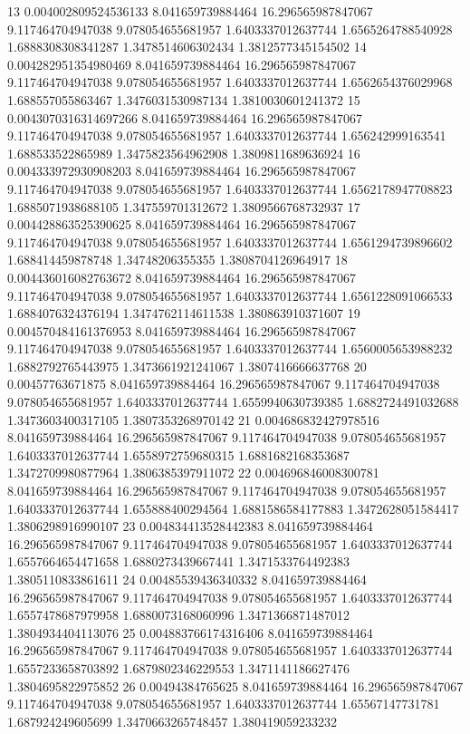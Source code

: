 {13 0.004002809524536133 8.041659739884464 16.296565987847067 9.117464704947038 9.078054655681957 1.6403337012637744 1.6565264788540928 1.6888308308341287 1.3478514606302434 1.3812577345154502
14 0.004282951354980469 8.041659739884464 16.296565987847067 9.117464704947038 9.078054655681957 1.6403337012637744 1.6562654376029968 1.688557055863467 1.3476031530987134 1.3810030601241372
15 0.0043070316314697266 8.041659739884464 16.296565987847067 9.117464704947038 9.078054655681957 1.6403337012637744 1.656242999163541 1.688533522865989 1.3475823564962908 1.3809811689636924
16 0.004333972930908203 8.041659739884464 16.296565987847067 9.117464704947038 9.078054655681957 1.6403337012637744 1.6562178947708823 1.6885071938688105 1.347559701312672 1.3809566768732937
17 0.004428863525390625 8.041659739884464 16.296565987847067 9.117464704947038 9.078054655681957 1.6403337012637744 1.6561294739896602 1.688414459878748 1.34748206355355 1.3808704126964917
18 0.004436016082763672 8.041659739884464 16.296565987847067 9.117464704947038 9.078054655681957 1.6403337012637744 1.6561228091066533 1.6884076324376194 1.3474762114611538 1.380863910371607
19 0.004570484161376953 8.041659739884464 16.296565987847067 9.117464704947038 9.078054655681957 1.6403337012637744 1.6560005653988232 1.6882792765443975 1.3473661921241067 1.3807416666637768
20 0.00457763671875 8.041659739884464 16.296565987847067 9.117464704947038 9.078054655681957 1.6403337012637744 1.6559940630739385 1.6882724491032688 1.3473603400317105 1.3807353268970142
21 0.004686832427978516 8.041659739884464 16.296565987847067 9.117464704947038 9.078054655681957 1.6403337012637744 1.6558972759680315 1.6881682168353687 1.3472709980877964 1.3806385397911072
22 0.004696846008300781 8.041659739884464 16.296565987847067 9.117464704947038 9.078054655681957 1.6403337012637744 1.655888400294564 1.6881586584177883 1.3472628051584417 1.3806298916990107
23 0.004834413528442383 8.041659739884464 16.296565987847067 9.117464704947038 9.078054655681957 1.6403337012637744 1.6557664654471658 1.6880273439667441 1.3471533764492383 1.3805110833861611
24 0.00485539436340332 8.041659739884464 16.296565987847067 9.117464704947038 9.078054655681957 1.6403337012637744 1.6557478687979958 1.6880073168060996 1.3471366871487012 1.3804934404113076
25 0.004883766174316406 8.041659739884464 16.296565987847067 9.117464704947038 9.078054655681957 1.6403337012637744 1.6557233658703892 1.6879802346229553 1.3471141186627476 1.3804695822975852
26 0.00494384765625 8.041659739884464 16.296565987847067 9.117464704947038 9.078054655681957 1.6403337012637744 1.65567147731781 1.687924249605699 1.3470663265748457 1.380419059233232
}
